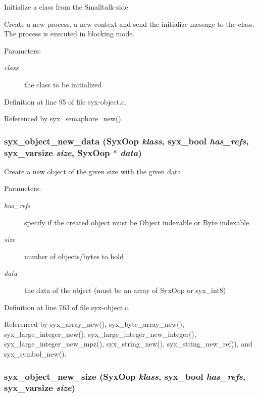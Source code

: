 Initialize a class from the Smalltalk-side

Create a new process, a new context and send the initialize message to the class. The process is executed in blocking mode.

\begin{Desc}
\item[Parameters:]
\begin{description}
\item[{\em class}]the class to be initialized \end{description}
\end{Desc}


Definition at line 95 of file syx-object.c.

Referenced by syx\_\-semaphore\_\-new().\hypertarget{syx-object_8c_fd74facabd8919359e6b26cbb0e10277}{
\subsubsection{ syx\_\-object\_\-new\_\-data ({\bf SyxOop} {\em klass}, \/  {\bf syx\_\-bool} {\em has\_\-refs}, \/  {\bf syx\_\-varsize} {\em size}, \/  {\bf SyxOop} $\ast$ {\em data})}}
\label{syx-object_8c_fd74facabd8919359e6b26cbb0e10277}


Create a new object of the given size with the given data.

\begin{Desc}
\item[Parameters:]
\begin{description}
\item[{\em has\_\-refs}]specify if the created object must be Object indexable or Byte indexable \item[{\em size}]number of objects/bytes to hold \item[{\em data}]the data of the object (must be an array of SyxOop or syx\_\-int8) \end{description}
\end{Desc}


Definition at line 763 of file syx-object.c.

Referenced by syx\_\-array\_\-new(), syx\_\-byte\_\-array\_\-new(), syx\_\-large\_\-integer\_\-new(), syx\_\-large\_\-integer\_\-new\_\-integer(), syx\_\-large\_\-integer\_\-new\_\-mpz(), syx\_\-string\_\-new(), syx\_\-string\_\-new\_\-ref(), and syx\_\-symbol\_\-new().\hypertarget{syx-object_8c_33e2745b5769c0bf58d0e761019c719a}{
\subsubsection{ syx\_\-object\_\-new\_\-size ({\bf SyxOop} {\em klass}, \/  {\bf syx\_\-bool} {\em has\_\-refs}, \/  {\bf syx\_\-varsize} {\em size})}}
\label{syx-object_8c_33e2745b5769c0bf58d0e761019c719a}


